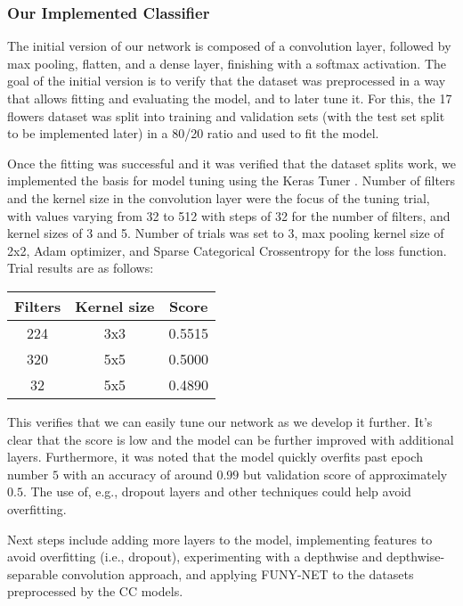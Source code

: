 \subsubsection{Our Implemented Classifier}
The initial version of our network is composed of a convolution layer, followed by max pooling, flatten, and a dense layer, finishing with a softmax activation. 
The goal of the initial version is to verify that the dataset was preprocessed in a way that allows fitting and evaluating the model, and to later tune it.
For this, the 17 flowers dataset was split into training and validation sets (with the test set split to be implemented later) in a 80/20 ratio and used to fit the model.

Once the fitting was successful and it was verified that the dataset splits work, we implemented the basis for model tuning using the Keras Tuner \cite{omalley2019kerastuner}.
Number of filters and the kernel size in the convolution layer were the focus of the tuning trial, with values varying from 32 to 512 with steps of 32 for the number of filters, and kernel sizes of 3 and 5.
Number of trials was set to 3, max pooling kernel size of 2x2, Adam optimizer, and Sparse Categorical Crossentropy for the loss function. Trial results are as follows:

\begin{tabular}{c|c|c}
    Filters&Kernel size&Score\\
    \hline
    \hline
    224&3x3&0.5515\\
    \hline
    320&5x5&0.5000\\
    \hline
    32&5x5&0.4890
\end{tabular}

This verifies that we can easily tune our network as we develop it further. It's clear that the score is low and the model can be further improved with additional layers.
Furthermore, it was noted that the model quickly overfits past epoch number $5$ with an accuracy of around $0.99$ but validation score of approximately $0.5$.
The use of, e.g., dropout layers and other techniques could help avoid overfitting.

Next steps include adding more layers to the model, implementing features to avoid overfitting (i.e., dropout), experimenting with a depthwise and depthwise-separable convolution approach, and applying FUNY-NET to the datasets preprocessed by the CC models.
